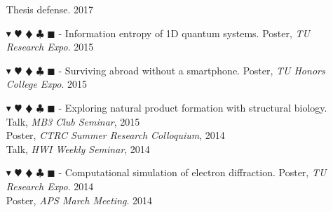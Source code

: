\documentclass[overlapped, 10pt]{res} %
\newcommand{\physics}{$\blacktriangledown$}
\newcommand{\biochem}{$\varheartsuit$}
\newcommand{\shannon}{$\vardiamondsuit$}
\newcommand{\classic}{$\clubsuit$}
\newcommand{\quantum}{$\blacksquare$}
\newcommand{\physicscolor}{\color{YellowOrange}}
\newcommand{\biochemcolor}{\color{Emerald}}
\newcommand{\shannoncolor}{\color{Goldenrod}}
\newcommand{\classiccolor}{\color{Cyan}}
\newcommand{\quantumcolor}{\color{RedOrange}}
\newcommand{\tag}[1]{
    {\IfSubStr{#1}{\physics}{\physicscolor}{\color{White}}\physics}
    {\IfSubStr{#1}{\biochem}{\biochemcolor}{\color{White}}\biochem}
    {\IfSubStr{#1}{\shannon}{\shannoncolor}{\color{White}}\shannon}
    {\IfSubStr{#1}{\classic}{\classiccolor}{\color{White}}\classic}
    {\IfSubStr{#1}{\quantum}{\quantumcolor}{\color{White}}\quantum}
}
\begin{document}
\begin{resume}
\begin{itemize}
    \hfill Thesis defense. 2017
\item[\tag{\physics\shannon\classic}-] Information entropy of 1D quantum systems.
    \hfill Poster, \textit{TU Research Expo}. 2015
\item[\tag{}-] Surviving abroad without a smartphone.
    \hfill Poster, \textit{TU Honors College Expo}. 2015
\item[\tag{\biochem\classic}-] Exploring natural product formation with structural biology.
    \hfill Talk, \textit{MB3 Club Seminar}, 2015
    \\ \null \hfill Poster, \textit{CTRC Summer Research Colloquium}, 2014
    \\ \null \hfill Talk, \textit{HWI Weekly Seminar}, 2014
\item[\tag{\physics\classic}-] Computational simulation of electron diffraction.
    \hfill Poster, \textit{TU Research Expo}. 2014
    \\ \null \hfill Poster, \textit{APS March Meeting}. 2014
\end{itemize}



\end{resume}
\end{document}
